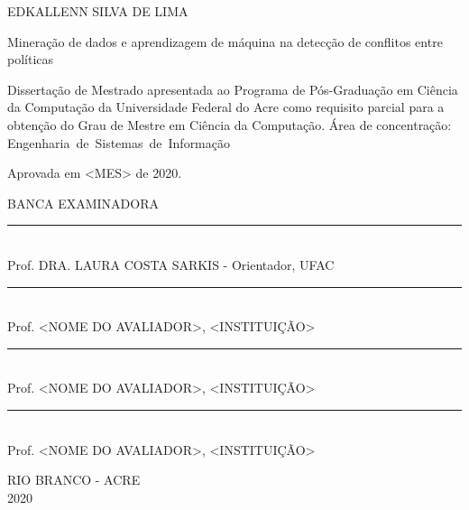 \vspace{-60mm}

\begin{center}
   {\large EDKALLENN SILVA DE LIMA}\\
   \vspace{7mm}

   Mineração de dados e aprendizagem de máquina na detecção de conflitos entre políticas\\
  \vspace{10mm}
\end{center}

\noindent
\begin{flushright}
\begin{minipage}[t]{8cm}

Dissertação de Mestrado apresentada ao Programa de Pós-Gradua\c{c}\~{a}o em Ciência da Computação da Universidade Federal do Acre como requisito parcial para a obtenção do Grau de Mestre em Ciência da Computação. \'{A}rea de concentra\c{c}\~{a}o: \mbox{Engenharia de Sistemas de Informação} 

\end{minipage}
\end{flushright}
\vspace{1.0 cm}
\noindent
{Aprovada em <MES> de 2020.} \\
\begin{flushright}
  \parbox{11cm}
  {
  \begin{center}
  BANCA EXAMINADORA \\
  \vspace{6mm}
  \rule{11cm}{.1mm} \\
    Prof. DRA. LAURA COSTA SARKIS - Orientador, UFAC \\
    \vspace{6mm}
  \rule{11cm}{.1mm} \\
    Prof. <NOME DO AVALIADOR>, <INSTITUI\c{C}\~AO>\\
    \vspace{6mm}
  \rule{11cm}{.1mm} \\
    Prof. <NOME DO AVALIADOR>, <INSTITUI\c{C}\~AO>\\
  \vspace{4mm}
  \rule{11cm}{.1mm} \\
    Prof. <NOME DO AVALIADOR>, <INSTITUI\c{C}\~AO>\\
    \vspace{6mm}

  \end{center}
  }
\end{flushright}
\begin{center}
  \vspace{4mm}
  RIO BRANCO - ACRE \\
  2020

\end{center}

